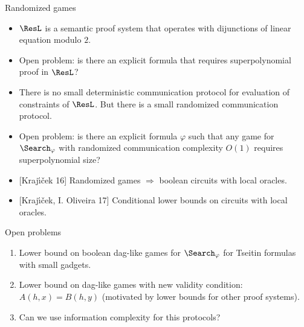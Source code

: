 \begin{frame}{Randomized games}

    \begin{itemize}
        \item $\ResL$ is a semantic proof system that operates with dijunctions of linear equation modulo
            $2$.
        \pause    
        \item Open problem: is there an explicit formula that requires superpolynomial proof in $\ResL$?
        \pause
        \item There is no small deterministic communication protocol for evaluation of constraints of
            $\ResL$. But there is a small randomized communication protocol.
        \pause
        \item Open problem: is there an explicit formula $\varphi$ such that any game for
            $\Search_{\varphi}$ with randomized communication complexity $O(1)$ requires superpolynomial
            size?
        \pause
        \item {[Kraj{\'{\i}}{\v{c}}ek 16]} Randomized games \alert{$\Rightarrow$} boolean circuits with
            local oracles.
        \pause
        \item {[Kraj{\'{\i}}{\v{c}}ek, I. Oliveira 17]} Conditional lower bounds on circuits with local
            oracles.
    \end{itemize}
\end{frame}


\begin{frame}{Open problems}
    \begin{enumerate}
            
        \pause
        \item Lower bound on boolean dag-like games for $\Search_{\varphi}$ for Tseitin formulas with small
            gadgets.
        \pause
        \item Lower bound on dag-like games with new validity condition: $A(h, x) = B(h, y)$ (motivated
            by lower bounds for other proof systems).
        \pause
        \item Can we use information complexity for this protocols?
    \end{enumerate}
\end{frame}
